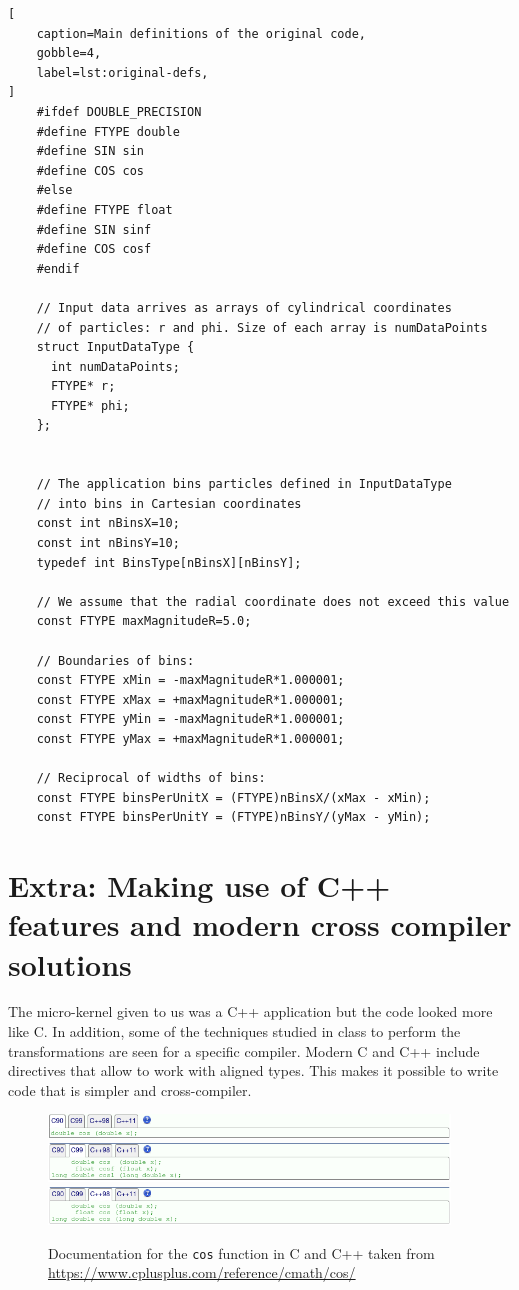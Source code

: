 \documentclass[
    12pt, %
]{fphw}
\newcommand{\tech}{\texttt}
\begin{document}
\begin{lstlisting}[
    caption=Main definitions of the original code,
    gobble=4,
    label=lst:original-defs,
]
    #ifdef DOUBLE_PRECISION
    #define FTYPE double
    #define SIN sin
    #define COS cos
    #else
    #define FTYPE float
    #define SIN sinf
    #define COS cosf
    #endif

    // Input data arrives as arrays of cylindrical coordinates
    // of particles: r and phi. Size of each array is numDataPoints
    struct InputDataType {
      int numDataPoints;
      FTYPE* r;
      FTYPE* phi;
    };


    // The application bins particles defined in InputDataType
    // into bins in Cartesian coordinates
    const int nBinsX=10;
    const int nBinsY=10;
    typedef int BinsType[nBinsX][nBinsY];

    // We assume that the radial coordinate does not exceed this value
    const FTYPE maxMagnitudeR=5.0;

    // Boundaries of bins:
    const FTYPE xMin = -maxMagnitudeR*1.000001;
    const FTYPE xMax = +maxMagnitudeR*1.000001;
    const FTYPE yMin = -maxMagnitudeR*1.000001;
    const FTYPE yMax = +maxMagnitudeR*1.000001;

    // Reciprocal of widths of bins:
    const FTYPE binsPerUnitX = (FTYPE)nBinsX/(xMax - xMin);
    const FTYPE binsPerUnitY = (FTYPE)nBinsY/(yMax - yMin);

\end{lstlisting}

\section{Extra: Making use of C++ features and modern cross compiler solutions}

    The micro-kernel given to us was a C++ application but the code looked more like C.
In addition, some of the techniques studied in class to perform the transformations
are seen for a specific compiler.
Modern C and C++ include directives that allow to work with aligned types.
This makes it possible to write code that is simpler and cross-compiler.

\begin{figure}[h]
    \centering
    \includegraphics[width=0.95\textwidth]{prac3/media/cos_c90_reference.png}
    \includegraphics[width=0.95\textwidth]{prac3/media/cos_c99_reference.png}
    \includegraphics[width=0.95\textwidth]{prac3/media/cos_cpp98_reference.png}
    \caption{Documentation for the \tech{cos} function in C and C++
    taken from \url{https://www.cplusplus.com/reference/cmath/cos/}}
\end{figure}
\end{document}
